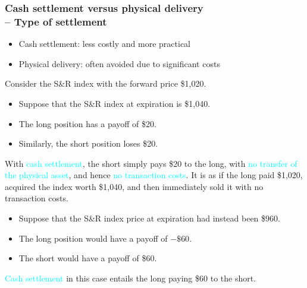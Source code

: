 \begin{frame}[fragile,t]
	\frametitle{Cash settlement versus physical delivery \\[0.5em]  -- Type of settlement}

	\begin{itemize}
		\item Cash settlement: less costly and more practical
		\item Physical delivery: often avoided due to significant costs
	\end{itemize}
	\bigskip
	\bigskip
	\pause

	\begin{myexample}
		Consider the S\&R index with the forward price \$1,020.\\
		\bigskip

		\begin{itemize}
			\item Suppose that the S\&R index at expiration is \$1,040.
			\item The long position has a payoff of \$20.
			\item Similarly, the short position loses \$20.
		\end{itemize}
		\pause With \textcolor{cyan}{cash settlement}, the short simply pays \$20 to the long, with
		\textcolor{cyan}{no transfer of the physical asset}, and hence \textcolor{cyan}{no transaction
		costs}.  It is as if the long paid \$1,020, acquired the index worth \$1,040, and then
		immediately sold it with no transaction costs.

		\pause
		\mySeparateLine
		\bigskip

		\begin{itemize}
			\item Suppose that the S\&R index price at expiration had instead been \$960.
			\item The long position would have a payoff of $-\$60$.
			\item The short would have a payoff of \$60.
		\end{itemize}
		\pause
		\textcolor{cyan}{Cash settlement} in this case entails the long paying \$60 to the short.
	\end{myexample}
\end{frame}
